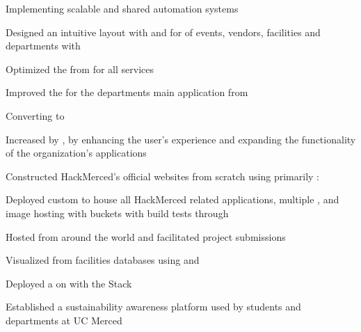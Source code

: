 \documentclass[]{hackathons}
\begin{document}
\begin{minipage}[t]{0.62\textwidth}
\begin{tightemize}
\item Implementing scalable and shared  automation systems
\item Designed an intuitive layout with  and  for  of events, vendors, facilities and departments with 
\item Optimized the  from  for all services
\item Improved the  for the departments main application from 
\item Converting  to 
\item Increased  by , by enhancing the user's experience and expanding the functionality of the organization's applications
\end{tightemize}
\medskip

\begin{tightemize}
\item Constructed HackMerced's official websites from scratch using primarily : 
\item Deployed custom  to house all HackMerced related applications, multiple , and image hosting with  buckets with build tests through 
\item Hosted  from around the world and facilitated  project submissions
\end{tightemize}
\medskip

\begin{tightemize}
\item Visualized  from facilities databases using  and 
\item Deployed a  on  with the  Stack
\item Established a sustainability awareness platform used by  students and  departments at UC Merced
\end{tightemize}
\medskip


\end{minipage}
\end{document}
